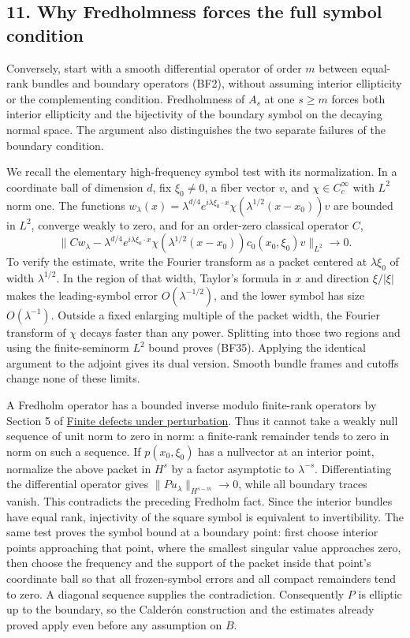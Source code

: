 \documentclass[
  11pt,
]{article}
\begin{document}
\subsection{11. Why Fredholmness forces the full symbol
condition}\label{why-fredholmness-forces-the-full-symbol-condition}

Conversely, start with a smooth differential operator of order \(m\)
between equal-rank bundles and boundary operators (BF2), without
assuming interior ellipticity or the complementing condition.
Fredholmness of \(A_s\) at one \(s\geq m\) forces both interior
ellipticity and the bijectivity of the boundary symbol on the decaying
normal space. The argument also distinguishes the two separate failures
of the boundary condition.

We recall the elementary high-frequency symbol test with its
normalization. In a coordinate ball of dimension \(d\), fix
\(\xi_0\ne0\), a fiber vector \(v\), and \(\chi\in C_c^\infty\) with
\(L^2\) norm one. The functions
\(w_\lambda(x)=\lambda^{d/4}e^{i\lambda\xi_0\cdot x}\chi(\lambda^{1/2}(x-x_0))v\)
are bounded in \(L^2\), converge weakly to zero, and for an order-zero
classical operator \(C\), \[
 \|Cw_\lambda-\lambda^{d/4}e^{i\lambda\xi_0\cdot x}
       \chi(\lambda^{1/2}(x-x_0))c_0(x_0,\xi_0)v\|_{L^2}
 \longrightarrow0.
 \tag{BF35}
\] To verify the estimate, write the Fourier transform as a packet
centered at \(\lambda\xi_0\) of width \(\lambda^{1/2}\). In the region
of that width, Taylor's formula in \(x\) and direction \(\xi/|\xi|\)
makes the leading-symbol error \(O(\lambda^{-1/2})\), and the lower
symbol has size \(O(\lambda^{-1})\). Outside a fixed enlarging multiple
of the packet width, the Fourier transform of \(\chi\) decays faster
than any power. Splitting into those two regions and using the
finite-seminorm \(L^2\) bound proves (BF35). Applying the identical
argument to the adjoint gives its dual version. Smooth bundle frames and
cutoffs change none of these limits.

A Fredholm operator has a bounded inverse modulo finite-rank operators
by Section 5 of \href{fredholm-stability.pdf}{Finite defects under
perturbation}. Thus it cannot take a weakly null sequence of unit norm
to zero in norm: a finite-rank remainder tends to zero in norm on such a
sequence. If \(p(x_0,\xi_0)\) has a nullvector at an interior point,
normalize the above packet in \(H^s\) by a factor asymptotic to
\(\lambda^{-s}\). Differentiating the differential operator gives
\(\|Pu_\lambda\|_{H^{s-m}}\to0\), while all boundary traces vanish. This
contradicts the preceding Fredholm fact. Since the interior bundles have
equal rank, injectivity of the square symbol is equivalent to
invertibility. The same test proves the symbol bound at a boundary
point: first choose interior points approaching that point, where the
smallest singular value approaches zero, then choose the frequency and
the support of the packet inside that point's coordinate ball so that
all frozen-symbol errors and all compact remainders tend to zero. A
diagonal sequence supplies the contradiction. Consequently \(P\) is
elliptic up to the boundary, so the Calderón construction and the
estimates already proved apply even before any assumption on \(B\).
\end{document}
